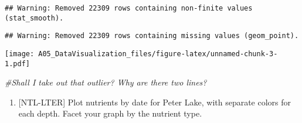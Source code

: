 \documentclass[]{article}
\newenvironment{Shaded}{\begin{snugshade}}{\end{snugshade}}
\newcommand{\CommentTok}[1]{\textcolor[rgb]{0.56,0.35,0.01}{\textit{#1}}}
\providecommand{\tightlist}{%
  \setlength{\itemsep}{0pt}\setlength{\parskip}{0pt}}
\begin{document}
\begin{verbatim}
## Warning: Removed 22309 rows containing non-finite values (stat_smooth).
\end{verbatim}

\begin{verbatim}
## Warning: Removed 22309 rows containing missing values (geom_point).
\end{verbatim}

\texttt{[image: A05\_DataVisualization\_files/figure-latex/unnamed-chunk-3-1.pdf]}

\begin{Shaded}
\begin{Highlighting}[]
\CommentTok{#Shall I take out that outlier? Why are there two lines?}
\end{Highlighting}
\end{Shaded}

\begin{enumerate}
\def\labelenumi{\arabic{enumi}.}
\setcounter{enumi}{4}
\tightlist
\item
  {[}NTL-LTER{]} Plot nutrients by date for Peter Lake, with separate
  colors for each depth. Facet your graph by the nutrient type.
\end{enumerate}
\end{document}
